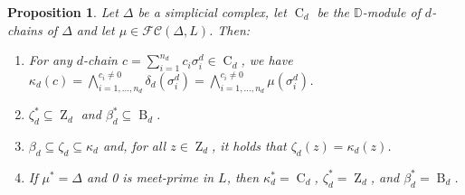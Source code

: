 \documentclass[a4paper,10pt]{article}
\newtheorem{proposition}[theorem]{Proposition}
\newcommand{\bbd}{\mathbb{D}}
\newcommand{\calfc}{\mathcal{FC}}
\DeclareMathOperator{\Co}{C}
\DeclareMathOperator{\Zo}{Z}
\DeclareMathOperator{\Bo}{B}
\begin{document}
\begin{proposition}
\label{prop:chains_submodules_properties}
Let \(\Delta\) be a simplicial complex, let \(\Co_d\) be the \(\bbd\)-module of \(d\)-chains of \(\Delta\)
and let \(\mu \in \calfc(\Delta,L)\). Then:
\begin{enumerate}[label=(\roman*)]
\item\label{item:d-chain-fuzzy} For any \(d\)-chain \(c = \sum_{i=1}^{n_d} c_i \sigma^{d}_i \in \Co_d\), we have
\(\kappa_d(c) = \bigwedge_{i=1,\ldots,n_d}^{c_i \neq 0} \delta_d(\sigma^{d}_i) = \bigwedge_{i=1,\ldots,n_d}^{c_i \neq 0}  \mu(\sigma^{d}_i)\).
\item\label{item:supportZB} \(\zeta_d^* \subseteq \Zo_d\) and \(\beta_d^* \subseteq \Bo_d\).
\item\label{item:beta-zeta-kappa} \(\beta_d \subseteq \zeta_d \subseteq \kappa_d\) and, for all \(z\in \Zo_d\), it holds that   \(\zeta_d(z)= \kappa_d(z)\).
\item \label{item:meet-prime} If \(\mu^* = \Delta\) and 0 is meet-prime in \(L\), then \(\kappa_d^* = \Co_d\), \(\zeta_d^* = \Zo_d\), and \(\beta_d^* = \Bo_d\).
\end{enumerate}
\end{proposition}
\end{document}
